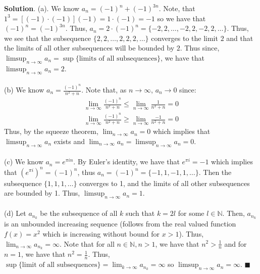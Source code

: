 \documentclass[12pt]{article}
\renewcommand{\=}[1]{\stackrel{#1}{=}} %
\providecommand{\NN}{\mathbb{N}}
\theoremstyle{definition}
\newenvironment{s}{%
        \begin{trivlist} \item \textbf{Solution}. }{%
            \hspace*{\fill} $\blacksquare$\end{trivlist}}%
\begin{document}
\begin{s}
    (a). We know $a_n = (-1)^n + (-1)^{3n}$. Note, that $1^3 = [(-1)\cdot(-1)](-1) = 1\cdot(-1) = -1$ so
    we have that $(-1)^n = (-1)^{3n}$. Thus, $a_n = 2\cdot(-1)^n = \{-2,2,\hdots,-2,2,-2,2,\hdots\}$. Thus, we see
    that the subsequence $\{2,2,\hdots,2,2,2,\hdots\}$ converges to the limit $2$ and that the limits of all other
    subsequences will be bounded by $2$. Thus since, $\limsup_{n\to\infty}a_n = \sup\{\text{limits of all subsequences}\}$,
    we have that $\limsup_{n\to\infty}a_n = 2$.\\ \\

    (b) We know $a_n = \frac{(-1)^n}{n^2+n}$. Note that, as $n\to\infty$, $a_n\to0$ since:
    \begin{align*}
        \lim_{n\to\infty} \frac{(-1)^n}{n^2+n} \leq \lim_{n\to\infty} \frac{1}{n^2+n} = 0 \\
        \lim_{n\to\infty} \frac{(-1)^n}{n^2+n} \geq \lim_{n\to\infty} \frac{-1}{n^2+n} = 0
    \end{align*}
    Thus, by the squeeze theorem, $\lim_{n\to\infty} a_n = 0$ which implies that $\limsup_{n\to\infty}a_n$ exists
    and $\lim_{n\to\infty} a_n = \limsup_{n\to\infty}a_n = 0$.\\ \\

    (c) We know $a_n = e^{\pi in}$. By Euler's identity, we have that $e^{\pi i} = -1$ which implies that
    $(e^{\pi i})^n = (-1)^n$, thus $a_n = (-1)^n = \{-1, 1, -1, 1, \hdots\}$. Then the subsequence $\{1, 1, 1, \hdots\}$ 
    converges to 1, and the limits of all other subsequences are bounded by 1. Thus,
    $\limsup_{n\to\infty} a_n = 1$.\\ \\

    (d) Let $a_{n_k}$ be the subsequence of all $k$ such that $k = 2l$ for some $l\in\NN$. Then, $a_{n_k}$ is an
    unbounded increasing sequence (follows from the real valued function $f(x) = x^2$ which is increasing without bound
    for $x>1$). Thus, $\lim_{n\to\infty} a_{n_k} = \infty$. Note that for all $n\in\NN, n > 1$, we have that $n^2 > \frac{1}{n}$
    and for $n=1$, we have that $n^2 = \frac{1}{n}$. Thus, $\sup\{\text{limit of all subsequences}\} = \lim_{k\to\infty} a_{n_k} = 
    \infty$ so $\limsup_{n\to\infty} a_n = \infty$.
\end{s}
\end{document}
